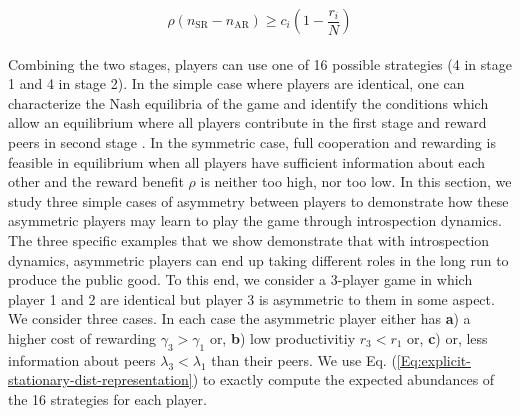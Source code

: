 \documentclass[11pt]{article}
\theoremstyle{plainCl1}
\theoremstyle{plainCl2}
\begin{document}
\begin{equation}
\rho(n_{\mathrm{SR}} - n_{\mathrm{AR}}) \geq c_i \left( 1 - \frac{r_i}{N} \right)
\label{Eq:palrewardsequation}
\end{equation}
\\
\noindent Combining the two stages, players can use one of 16 possible strategies (4 in stage 1 and 4 in stage 2). In the simple case where players are identical, one can characterize the Nash equilibria of the game and identify the conditions which allow an equilibrium where all players contribute in the first stage and reward peers in second stage \cite{Pal:NatCom:2022}. In the symmetric case, full cooperation and rewarding is feasible in equilibrium when all players have sufficient information about each other and the reward benefit $\rho$ is neither too high, nor too low. In this section, we study three simple cases of asymmetry between players to demonstrate how these asymmetric players may learn to play the game through introspection dynamics. The three specific examples that we show demonstrate that with introspection dynamics, asymmetric players can end up taking different roles in the long run to produce the public good. To this end, we consider a 3-player game in which player 1 and 2 are identical but player 3 is asymmetric to them in some aspect. We consider three cases. In each case the asymmetric player either has \textbf{a}) a higher cost of rewarding $\gamma_3 > \gamma_1$  or, \textbf{b}) low productivitiy  $r_3 < r_1$ or, \textbf{c}) or, less information about peers $\lambda_3 < \lambda_1$ than their peers. We use Eq. (\ref{Eq:explicit-stationary-dist-representation}) to exactly compute the expected abundances of the 16 strategies for each player. 
\\ \\
\end{document}
